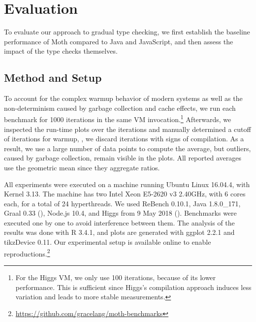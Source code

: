 
\section{Evaluation}
\label{sec:evaluation}

\newcommand{\NumIterationsAll}{1000\xspace}
\newcommand{\NumIterationsHiggs}{100\xspace}


To evaluate our approach to gradual type checking,
we first establish the baseline performance of Moth
compared to Java and JavaScript,
and then assess the impact of the type checks themselves.

\subsection{Method and Setup}

To account for the complex warmup behavior
of modern systems\citep{Barrett:2017:VMW} as well as
the non-determinism caused by \eg garbage collection and cache effects,
we run each benchmark for \NumIterationsAll iterations in the same
VM invocation.\footnote{
For the Higgs VM, we only use \NumIterationsHiggs iterations,
because of its lower performance.
This is sufficient since Higgs's compilation approach induces less variation
and leads to more stable measurements.}
Afterwards, we inspected the run-time plots over the iterations
and manually determined a cutoff of \WarmupCutOff iterations for warmup,
\ie, we discard iterations with signs of compilation.
As a result, we use a large number of data points to compute the average,
but outliers, caused by \eg garbage collection, remain visible in the plots.
All reported averages use the geometric mean since they aggregate ratios.

%
All experiments were executed on a machine running Ubuntu Linux 16.04.4,
with Kernel 3.13.
The machine has two Intel Xeon E5-2620 v3 2.40GHz,
with 6 cores each, for a total of 24 hyperthreads.
We used ReBench 0.10.1\citep{ReBench:2018}, Java 1.8.0\_171, Graal 0.33 (),
Node.js 10.4, and Higgs from 9 May 2018 ().
Benchmarks were executed one by one to avoid interference between them.
The analysis of the results was done with R 3.4.1,
and plots are generated with ggplot 2.2.1 and tikzDevice 0.11.
Our experimental setup is available online to enable reproductions.\footnote{
\url{https://github.com/gracelang/moth-benchmarks}}


